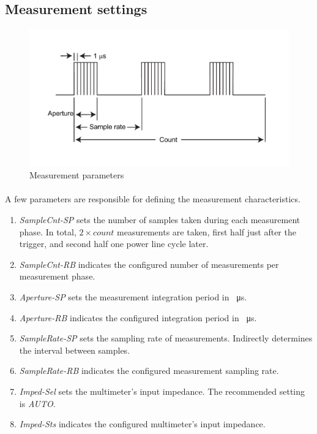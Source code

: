 \documentclass[openany]{article}
\begin{document}
	\subsection{Measurement settings}

		\begin{figure}[!h]
			\caption{Measurement parameters}
			\label{fig:meas-param}
			\centering
			\includegraphics[width=1.0\textwidth]{ict-meas-param-image}
		\end{figure}
\FloatBarrier

		\paragraph{} A few parameters are responsible for defining the measurement characteristics.

			\begin{enumerate}
				\item \emph{SampleCnt-SP} sets the number of samples taken during each measurement phase. In total, $ 2\times count $ measurements are taken, first half just after the trigger, and second half one power line cycle later.
				\item \emph{SampleCnt-RB} indicates the configured number of measurements per measurement phase.
				\item \emph{Aperture-SP} sets the measurement integration period in \SI{}{\micro\second}.
				\item \emph{Aperture-RB} indicates the configured integration period in \SI{}{\micro\second}.
				\item \emph{SampleRate-SP} sets the sampling rate of measurements. Indirectly determines the interval between samples.
				\item \emph{SampleRate-RB} indicates the configured measurement sampling rate.
				\item \emph{Imped-Sel} sets the multimeter's input impedance. The recommended setting is \emph{AUTO}.
				\item \emph{Imped-Sts} indicates the configured multimeter's input impedance.
			\end{enumerate}
\end{document}
